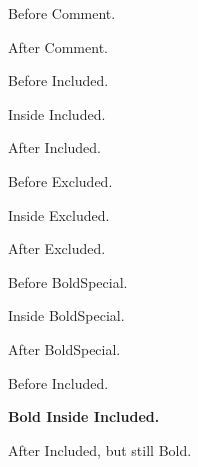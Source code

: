 \documentclass{article}
\begin{document}
Before Comment.
\begin{comment}
Inside Comment.
\end{comment}
After Comment.

Before Included.
\begin{Included}
Inside Included.
\end{Included}
After Included.

Before Excluded.
\begin{Excluded}
Inside Excluded.
\end{Excluded}
After Excluded.

Before BoldSpecial.
\begin{BoldSpecial}
Inside BoldSpecial.
\end{BoldSpecial}
After BoldSpecial.

Before Included.
\begin{Included}
\bf Bold Inside Included.
\end{Included}
After Included, but still Bold.
\end{document}
